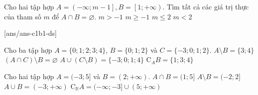 \begin{ex}%
	Cho hai tập hợp $A =\left( -\infty; m -1\right], B =\left[ 1; +\infty \right)$. Tìm tất cả các giá trị thực của tham số $m$ để $A \cap B = \varnothing$.
	\choice
	{$m > -1 $}
	{$m \geq -1$}
	{$m \leq 2$}
	{\True $m < 2$}
\end{ex}
\TNTF
\setcounter{ex}{0}
[ans/ans-c1b1-ds]
\begin{ex}%
	Cho ba tập hợp $A=\{0; 1; 2; 3; 4\}$, $B=\{0; 1; 2\}$ và $C=\{-3; 0; 1; 2\}$.
	\choiceTF
	{\True $A \setminus B=\{3; 4\}$}
	{\True $(A \cap C) \setminus B=\varnothing$}
	{$A \cup(C \setminus B)=\{-3; 0; 1; 4\}$}
	{$\mathrm{C}_A B=\{1; 3; 4\}$}
\end{ex}
\begin{ex}%
	Cho hai tập hợp $A=(-3; 5]$ và $B=(2;+\infty)$.
	\choiceTF
	{$A \cap B=(1; 5]$}
	{$A \setminus B=(-2; 2]$}
	{\True $A \cup B=(-3; +\infty)$}
	{\True $\mathrm{C}_{\mathbb{R}}A=(-\infty; -3] \cup(5; +\infty)$}
\loigiai{
	\begin{itemchoice}
		\itemch
		Ta có $A \cap B=(2; 5]$.
		\itemch
		Ta có $A \setminus B=(-3; 2]$.
		\itemch
		Ta có $A \cup B=(-3; +\infty)$.
		\itemch
		Ta có $\mathrm{C}_{\mathbb{R}}A=(-\infty; -3] \cup(5; +\infty)$.
	\end{itemchoice}
	}
\end{ex}
